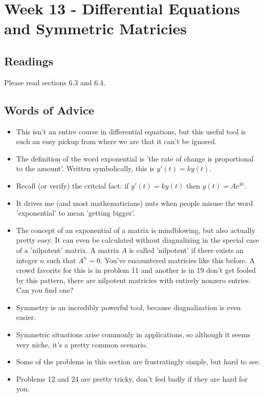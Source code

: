 	\clearpage



	\section{Week 13 - Differential Equations and Symmetric Matricies}

	\subsection{Readings}
		Please read sections 6.3 and 6.4.

	\subsection{Words of Advice}
		\begin{itemize}
			\item This isn't an entire course in differential equations, but this useful tool is such an easy pickup from where we are that it can't be ignored.
			\item The definition of the word exponential is 'the rate of change is proportional to the amount'. Written symbolically, this is $y'(t) = ky(t)$.
			\item Recall (or verify) the critcial fact: if $y'(t) = ky(t)$ then $y(t) = Ae^{kt}$.
			\item It drives me (and most mathematicians) nuts when people misuse the word 'exponential' to mean 'getting bigger'.
			\item The concept of an exponential of a matrix is mindblowing, but also actually pretty easy. It can even be calculated without diagnalizing in the special case of a 'nilpotent' matrix. A matrix $A$ is called 'nilpotent' if there exists an integer $n$ such that $A^n =0$. You've encountered matricies like this before. A crowd favorite for this is in problem 11 and another is in 19 don't get fooled by this pattern, there are nilpotent matricies with entirely nonzero entries. Can you find one?
			\item Symmetry is an incredibly powerful tool, because diagnalization is even easier.
			\item Symmetric situations arise commonly in applications, so although it seems very niche, it's a pretty common scenario.
			\item Some of the problems in this section are frustratingly simple, but hard to see.
			\item Problems 12 and 24 are pretty tricky, don't feel badly if they are hard for you.
		\end{itemize}

